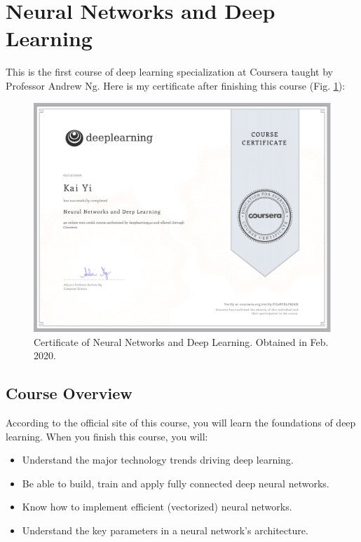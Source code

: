 \section{Neural Networks and Deep Learning}
This is the first course of deep learning specialization at Coursera taught by Professor Andrew Ng. Here is my certificate after finishing this course (Fig. \ref{C1-Certificate}):

\begin{figure}[!htbp]
    \centering
    \includegraphics[width=1.0\textwidth]{img/C1-Certificate.pdf}
    \caption{Certificate of Neural Networks and Deep Learning. Obtained in Feb. 2020.}
    \label{C1-Certificate}
\end{figure}

\subsection{Course Overview}
According to the official site of this course, you will learn the foundations of deep learning. When you finish this course, you will:

\begin{itemize}
    \item Understand the major technology trends driving deep learning.
    \item Be able to build, train and apply fully connected deep neural networks.
    \item Know how to implement efficient (vectorized) neural networks.
    \item Understand the key parameters in a neural network's architecture.
\end{itemize}

